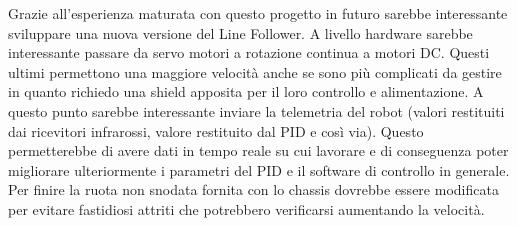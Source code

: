 \documentclass[twoside,twocolumn]{article}
\begin{document}
Grazie all'esperienza maturata con questo progetto in futuro sarebbe interessante sviluppare una nuova versione del Line Follower. A livello hardware sarebbe interessante passare da servo motori a rotazione continua a motori DC. Questi ultimi permettono una maggiore velocità anche se sono più complicati da gestire in quanto richiedo una shield apposita per il loro controllo e alimentazione.
A questo punto sarebbe interessante inviare la telemetria del robot (valori restituiti dai ricevitori infrarossi, valore restituito dal PID e così via). Questo permetterebbe di avere dati in tempo reale su cui lavorare e di conseguenza poter migliorare ulteriormente i parametri del PID e il software di controllo in generale.
Per finire la ruota non snodata fornita con lo chassis dovrebbe essere modificata per evitare fastidiosi attriti che potrebbero verificarsi aumentando la velocità.
\end{document}
